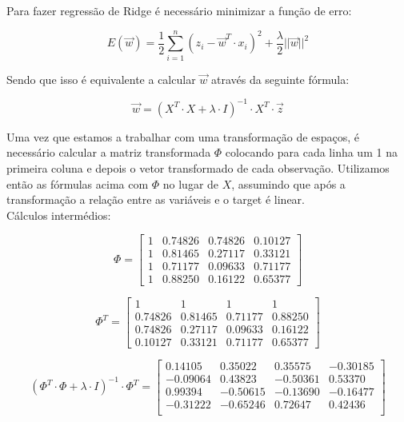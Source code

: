 \documentclass[a4paper,12pt]{article} %
\begin{document}
\begin{enumerate}
Para fazer regressão de Ridge é necessário minimizar a função de erro:

\begin{equation}
    E(\vec{w}) = \frac{1}{2} \sum_{i=1}^{n} (z_i - \vec{w}^T \cdot x_i)^2 + \frac{\lambda}{2} ||\vec{w}||^2
\end{equation}

Sendo que isso é equivalente a calcular $\vec{w}$ através da seguinte fórmula:

\begin{equation}
    \vec{w} = (X^T\cdot X + \lambda \cdot I)^{-1} \cdot X^T \cdot \vec{z}
\end{equation}

Uma vez que estamos a trabalhar com uma transformação de espaços, é necessário
calcular a matriz transformada $\Phi$ colocando para cada linha um 1 na primeira
coluna e depois o vetor transformado de cada observação. Utilizamos então as 
fórmulas acima com $\Phi$ no lugar de $X$, assumindo que após a transformação a 
relação entre as variáveis e o target é linear.\\ 

Cálculos intermédios:

\begin{equation*}
    \Phi = 
\begin{bmatrix}
    1 & 0.74826 & 0.74826 & 0.10127 \\ 1 & 0.81465 & 0.27117 & 0.33121 \\ 1 & 0.71177 & 0.09633 & 0.71177 \\ 1 & 0.88250 & 0.16122 & 0.65377
\end{bmatrix}
\end{equation*}

\begin{equation*}
    \Phi^T = \begin{bmatrix}
    1 & 1 & 1 & 1 \\ 0.74826 & 0.81465 & 0.71177 & 0.88250 \\ 0.74826 & 0.27117 & 0.09633 & 0.16122 \\ 0.10127 & 0.33121 & 0.71177 & 0.65377
    \end{bmatrix}
\end{equation*}

\begin{equation*}
    (\Phi^T\cdot \Phi + \lambda \cdot I)^{-1} \cdot \Phi^T = \begin{bmatrix}  0.14105 & 0.35022 & 0.35575 & -0.30185 \\
        -0.09064 & 0.43823 & -0.50361 & 0.53370 \\
         0.99394 & -0.50615  & -0.13690 & -0.16477 \\
        -0.31222 & -0.65246 & 0.72647  &  0.42436 \\ \end{bmatrix}
\end{equation*}


\end{enumerate}
\end{document}
